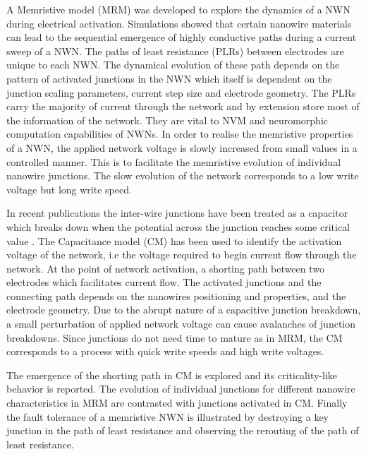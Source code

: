 A Memristive model (MRM) was developed to explore the dynamics of a NWN during electrical activation. Simulations showed that certain nanowire materials can lead to the sequential emergence of highly conductive paths during a current sweep of a NWN. The paths of least resistance (PLRs) between electrodes are unique to each NWN. The dynamical evolution of these path depends on the pattern of activated junctions in the NWN which itself is dependent on the junction scaling parameters, current step size and electrode geometry. The PLRs carry the majority of current through the network and by extension store most of the information of the network. They are vital to NVM and neuromorphic computation capabilities of NWNs. In order to realise the memristive properties of a NWN, the applied network voltage is slowly increased from small values in a controlled manner. This is to facilitate the memristive evolution of individual nanowire junctions. The slow evolution of the network corresponds to a low write voltage but long write speed.

In recent publications the inter-wire junctions have been treated as a capacitor which breaks down when the potential across the junction reaches some critical value \cite{nirmalraj2012,fairfield2014}. The Capacitance model (CM) has been used to identify the activation voltage of the network, i.e the voltage required to begin current flow through the network. At the point of network activation, a shorting path between two electrodes which facilitates current flow. The activated junctions and the connecting path depends on the nanowires positioning and properties, and the electrode geometry. Due to the abrupt nature of a capacitive junction breakdown, a small perturbation of applied network voltage can cause avalanches of junction breakdowns. Since junctions do not need time to mature as in MRM, the CM corresponds to a process with quick write speeds and high write voltages.

The emergence of the shorting path in CM is explored and its criticality-like behavior is reported. The evolution of individual junctions for different nanowire characteristics in MRM are contrasted with junctions activated in CM. Finally the fault tolerance of a memristive NWN is illustrated by destroying a key junction in the path of least resistance and observing the rerouting of the path of least resistance.

